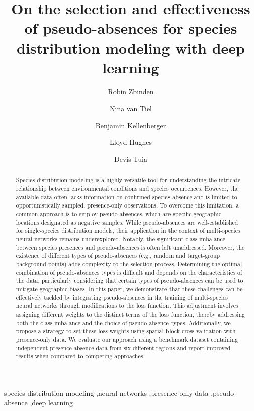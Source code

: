 \documentclass[3p,preprint,12pt]{elsarticle}
\makeatletter
\def\ead{\@ifnextchar[{\@uad}{\@ead}}
\gdef\@ead#1{\bgroup
   \def\_{\string\underscorechar\space}
   \def\{{\string\lbracechar\space}
   \def\textdagger{\string\textdagger\space}
   \def\texttildeapprox{\string\texttildeapprox\space}
   \def~{\hashchar\space}
   \def\}{\string\rbracechar\space}
   \edef\tmp{\the\@eadauthor}
   \immediate\write\@auxout{\string\emailauthor
     {#1}{\expandafter\strip@prefix\meaning\tmp}}
  \egroup
}
\gdef\emailauthor#1#2{\stepcounter{ead}
      \g@addto@macro\@elseads{\raggedright
      \let\corref\@gobble
      \eadsep\texttt{#1} (#2)
      \def\eadsep{\unskip,\space}}
}
\makeatother
\begin{document}
\begin{frontmatter}

    \title{
  On the selection and effectiveness of pseudo-absences for species distribution modeling with deep learning    
} 
    
\author[a3053a9616d83]{Robin Zbinden}
\ead{robin.zbinden@epfl.ch}\cortext[c-40c753e77c82]{Corresponding author.}
\author[a3053a9616d83]{Nina van Tiel}
\author[a6fd8d792e0f6]{Benjamin Kellenberger}
\author[a3053a9616d83]{Lloyd Hughes}
\author[a3053a9616d83]{Devis Tuia}

    
\address[a3053a9616d83]{
    Ecole Polytechnique Fédérale de Lausanne (EPFL), Environmental Computational Science and Earth Observation (ECEO) Laboratory, Switzerland}
  	
\address[a6fd8d792e0f6]{
    Yale University, Jetz Lab, USA}
  

\begin{abstract}
Species distribution modeling is a highly versatile tool for understanding the intricate relationship between environmental conditions and species occurrences. However, the available data often lacks information on confirmed species absence and is limited to opportunistically sampled, presence-only observations. To overcome this limitation, a common approach is to employ pseudo-absences, which are specific geographic locations designated as negative samples. While pseudo-absences are well-established for single-species distribution models, their application in the context of multi-species neural networks remains underexplored. Notably, the significant class imbalance between species presences and pseudo-absences is often left unaddressed. Moreover, the existence of different types of pseudo-absences (e.g., random and target-group background points) adds complexity to the selection process. Determining the optimal combination of pseudo-absences types is difficult and depends on the characteristics of the data, particularly considering that certain types of pseudo-absences can be used to mitigate geographic biases. In this paper, we demonstrate that these challenges can be effectively tackled by integrating pseudo-absences in the training of multi-species neural networks through modifications to the loss function. This adjustment involves assigning different weights to the distinct terms of the loss function, thereby addressing both the class imbalance and the choice of pseudo-absence types. Additionally, we propose a strategy to set these loss weights using spatial block cross-validation with presence-only data. We evaluate our approach using a benchmark dataset containing independent presence-absence data from six different regions and report improved results when compared to competing approaches.
\end{abstract}
      \begin{keyword}
    species distribution modeling \sep neural networks \sep presence-only data \sep pseudo-absence \sep deep learning
      \end{keyword}
    

\end{frontmatter}
\end{document}
